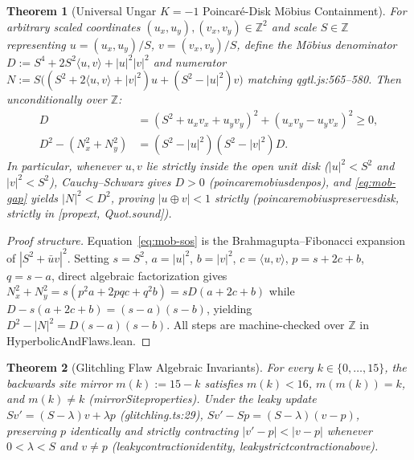\documentclass[11pt,a4paper]{article}
\numberwithin{equation}{section}
\theoremstyle{plain}
\newtheorem{theorem}{Theorem}[section]
\theoremstyle{definition}
\theoremstyle{remark}
\newcommand{\Z}{\mathbb{Z}}
\newcommand{\code}[1]{{\ttfamily\footnotesize\def\_{\textunderscore\penalty0\hskip0pt}#1}}
\begin{document}
\begin{theorem}[Universal Ungar $K=-1$ Poincar\'e-Disk M\"obius Containment]
\label{thm:poincare}
For arbitrary scaled coordinates $(u_x, u_y), (v_x, v_y) \in \Z^2$ and scale $S \in \Z$ representing $u = (u_x, u_y)/S$, $v = (v_x, v_y)/S$, define the M\"obius denominator $D := S^4 + 2 S^2 \langle u,v\rangle + |u|^2|v|^2$ and numerator $N := S\bigl((S^2 + 2\langle u,v\rangle + |v|^2)u + (S^2 - |u|^2)v\bigr)$ matching \code{qgtl.js:565--580}. Then unconditionally over $\Z$:
\begin{align}
  D &= (S^2 + u_x v_x + u_y v_y)^2 + (u_x v_y - u_y v_x)^2 \ge 0, \label{eq:mob-sos} \\
  D^2 - (N_x^2 + N_y^2) &= (S^2 - |u|^2)(S^2 - |v|^2) D. \label{eq:mob-gap}
\end{align}
In particular, whenever $u, v$ lie strictly inside the open unit disk ($|u|^2 < S^2$ and $|v|^2 < S^2$), Cauchy--Schwarz gives $D > 0$ (\code{poincare\_mobius\_den\_pos}), and \eqref{eq:mob-gap} yields $|N|^2 < D^2$, proving $|u \oplus v| < 1$ strictly (\code{poincare\_mobius\_preserves\_disk}, strictly in \code{[propext, Quot.sound]}).
\end{theorem}

\begin{proof}[Proof structure]
Equation~\eqref{eq:mob-sos} is the Brahmagupta--Fibonacci expansion of $|S^2 + \bar u v|^2$. Setting $s = S^2$, $a = |u|^2$, $b = |v|^2$, $c = \langle u,v\rangle$, $p = s + 2c + b$, $q = s - a$, direct algebraic factorization gives $N_x^2 + N_y^2 = s(p^2 a + 2pqc + q^2 b) = s D (a + 2c + b)$ while $D - s(a+2c+b) = (s-a)(s-b)$, yielding $D^2 - |N|^2 = D(s-a)(s-b)$. All steps are machine-checked over $\Z$ in \code{HyperbolicAndFlaws.lean}.
\end{proof}

\begin{theorem}[Glitchling Flaw Algebraic Invariants]
\label{thm:flaws}
For every $k \in \{0,\dots,15\}$, the \code{backwards} site mirror $m(k) := 15 - k$ satisfies $m(k) < 16$, $m(m(k)) = k$, and $m(k) \ne k$ (\code{mirrorSite\_properties}). Under the \code{leaky} update $S v' = (S - \lambda)v + \lambda p$ (\code{glitchling.ts:29}), $S v' - S p = (S - \lambda)(v - p)$, preserving $p$ identically and strictly contracting $|v' - p| < |v - p|$ whenever $0 < \lambda < S$ and $v \ne p$ (\code{leaky\_contraction\_identity}, \code{leaky\_strict\_contraction\_above}).
\end{theorem}

\end{document}
